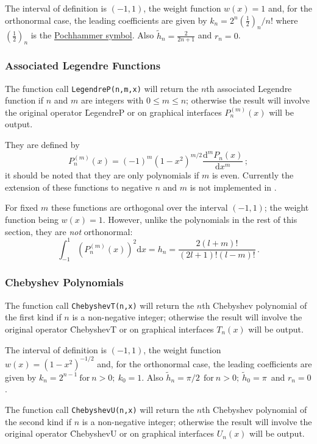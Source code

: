 The interval of definition is $(-1, 1)$, the weight function $w(x)=1$ and,
for the orthonormal case, the leading coefficients are given by
$k_n=2^n (\frac{1}{2})_n/n!$ where $(\frac{1}{2})_n$ is the
\hyperlink{POCH}{Pochhammer symbol}.
Also $\tilde{h}_n = \frac{2}{2 n +1}$ and $r_n =0$.

\subsubsection{Associated Legendre Functions}
The function call \texttt{LegendreP(n,m,x)} will return the $n$th associated
Legendre function if $n$ and $m$ are integers with $0 \leq m \leq n$;
otherwise the result will involve the original operator \f{LegendreP} or
on graphical interfaces $P_n^{(m)}(x)$ will be output.

They are defined by
\[P_n^{(m)}(x) = (-1)^m(1-x^2)^{m/2}\frac{\mathrm{d}^m P_n(x)}{\mathrm{d}x^m}\,;\]
it should be noted that they are only polynomials if $m$ is even. Currently
the extension of these functions to negative $n$ and $m$ is not implemented
in \REDUCE.

For fixed $m$ these functions are orthogonal over the interval $(-1, 1)$;
the weight function being $w(x)=1$. However, unlike the polynomials in the rest
of this section, they are \emph{not} orthonormal:
\[\int_{-1}^1 \left(P_n^{(m)}(x)\right)^2 \mathrm{d}x = h_n =
\frac{2(l+m)!}{(2l+1)!(l-m)!}\,.\]

\subsubsection{Chebyshev Polynomials}
\hypertarget{operator:CHEBYSHEVT}{}
\hypertarget{operator:CHEBYSHEVU}{}
 
The function call \texttt{ChebyshevT(n,x)} will return the $n$th Chebyshev
polynomial of the first kind if $n$ is a non-negative integer; otherwise the
result will involve the original operator \f{ChebyshevT} or on graphical
interfaces $T_n(x)$ will be output.

The interval of definition is $(-1, 1)$, the weight function
$w(x)=(1-x^2)^{-1/2}$ and, for the orthonormal case, the leading
coefficients are given by $k_n= 2^{n-1}\ \mbox{for}\ n>0;\ k_0 =1$. Also
$\tilde{h}_n = \pi/2\ \ \mbox{for}\ n>0;\ \tilde{h}_0 =\pi\,$ and $r_n=0$.

The function call \texttt{ChebyshevU(n,x)} will return the $n$th Chebyshev
polynomial of the second kind if $n$ is a non-negative integer; otherwise the
result will involve the original operator \f{ChebyshevU} or on graphical
interfaces $U_n(x)$ will be output.

